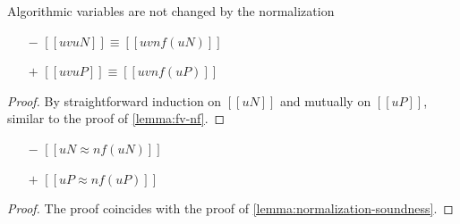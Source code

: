 \begin{lemma}
  \label{lemma:uv-nf}
  Algorithmic variables are not changed by the normalization
  \begin{itemize}
  \item[$-$] $[[uv uN]] \equiv [[uv nf(uN)]]$
  \item[$+$] $[[uv uP]] \equiv [[uv nf(uP)]]$
  \end{itemize}
\end{lemma}
\begin{proof}
  By straightforward induction on $[[uN]]$ and mutually on $[[uP]]$, 
  similar to the proof of \cref{lemma:fv-nf}.
\end{proof}

\begin{lemma}
  \label{lemma:normalization-soundness-alg}
  \hfill
  \begin{itemize}
    \item[$-$] $[[uN ≈ nf(uN)]]$
    \item[$+$] $[[uP ≈ nf(uP)]]$
  \end{itemize}
\end{lemma}
\begin{proof}
  The proof coincides with the proof of \cref{lemma:normalization-soundness}.
\end{proof}
